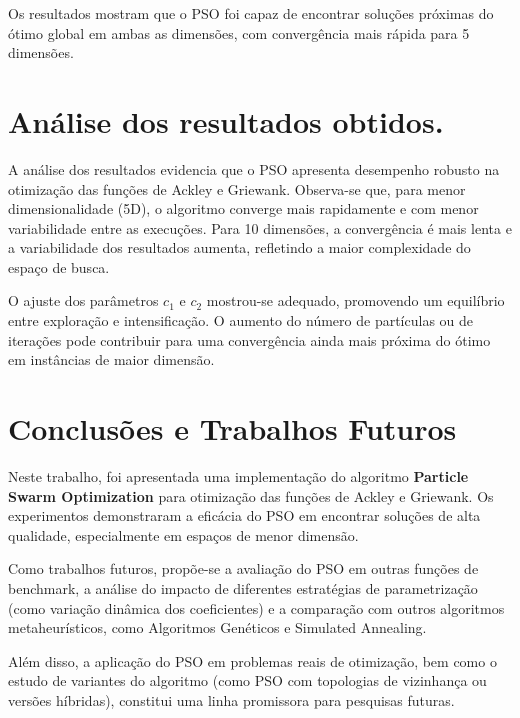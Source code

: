 \documentclass[12pt]{article}
\begin{document}
Os resultados mostram que o PSO foi capaz de encontrar soluções próximas do ótimo global em ambas as dimensões, com convergência mais rápida para 5 dimensões.

\section{Análise dos resultados obtidos.}
\label{sec:analise_dos_resultados_obtidos}

A análise dos resultados evidencia que o PSO apresenta desempenho robusto na otimização das funções de Ackley e Griewank. Observa-se que, para menor dimensionalidade (5D), o algoritmo converge mais rapidamente e com menor variabilidade entre as execuções. Para 10 dimensões, a convergência é mais lenta e a variabilidade dos resultados aumenta, refletindo a maior complexidade do espaço de busca.

O ajuste dos parâmetros $c_1$ e $c_2$ mostrou-se adequado, promovendo um equilíbrio entre exploração e intensificação. O aumento do número de partículas ou de iterações pode contribuir para uma convergência ainda mais próxima do ótimo em instâncias de maior dimensão.

\section{Conclusões e Trabalhos Futuros}
\label{sec:conclusoes_e_trabalhos_futuros}

Neste trabalho, foi apresentada uma implementação do algoritmo \textbf{Particle Swarm Optimization} para otimização das funções de Ackley e Griewank. Os experimentos demonstraram a eficácia do PSO em encontrar soluções de alta qualidade, especialmente em espaços de menor dimensão.

Como trabalhos futuros, propõe-se a avaliação do PSO em outras funções de benchmark, a análise do impacto de diferentes estratégias de parametrização (como variação dinâmica dos coeficientes) e a comparação com outros algoritmos metaheurísticos, como Algoritmos Genéticos e Simulated Annealing.

Além disso, a aplicação do PSO em problemas reais de otimização, bem como o estudo de variantes do algoritmo (como PSO com topologias de vizinhança ou versões híbridas), constitui uma linha promissora para pesquisas futuras.



\end{document}
